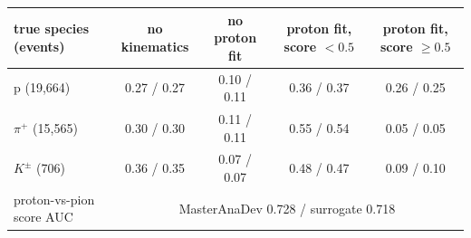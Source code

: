 \begin{tabular}{lcccc}
\toprule
true species (events) & no kinematics & no proton fit & proton fit, score $<0.5$ & proton fit, score $\geq 0.5$ \\
\midrule
p (19,664) & 0.27 / 0.27 & 0.10 / 0.11 & 0.36 / 0.37 & 0.26 / 0.25 \\
$\pi^+$ (15,565) & 0.30 / 0.30 & 0.11 / 0.11 & 0.55 / 0.54 & 0.05 / 0.05 \\
$K^\pm$ (706) & 0.36 / 0.35 & 0.07 / 0.07 & 0.48 / 0.47 & 0.09 / 0.10 \\
\midrule
proton-vs-pion score AUC & \multicolumn{4}{c}{MasterAnaDev 0.728 / surrogate 0.718} \\
\bottomrule
\end{tabular}
